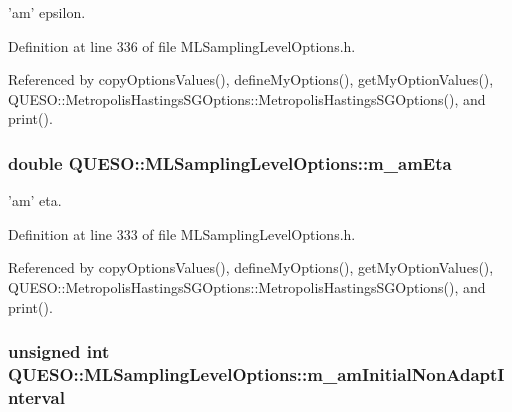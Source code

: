'am' epsilon. 



Definition at line 336 of file M\-L\-Sampling\-Level\-Options.\-h.



Referenced by copy\-Options\-Values(), define\-My\-Options(), get\-My\-Option\-Values(), Q\-U\-E\-S\-O\-::\-Metropolis\-Hastings\-S\-G\-Options\-::\-Metropolis\-Hastings\-S\-G\-Options(), and print().

\hypertarget{class_q_u_e_s_o_1_1_m_l_sampling_level_options_a87fe9b1c390bf7bff2ecc329064e7618}{
\subsubsection[{m\-\_\-am\-Eta}]{\setlength{\rightskip}{0pt plus 5cm}double Q\-U\-E\-S\-O\-::\-M\-L\-Sampling\-Level\-Options\-::m\-\_\-am\-Eta}}\label{class_q_u_e_s_o_1_1_m_l_sampling_level_options_a87fe9b1c390bf7bff2ecc329064e7618}


'am' eta. 



Definition at line 333 of file M\-L\-Sampling\-Level\-Options.\-h.



Referenced by copy\-Options\-Values(), define\-My\-Options(), get\-My\-Option\-Values(), Q\-U\-E\-S\-O\-::\-Metropolis\-Hastings\-S\-G\-Options\-::\-Metropolis\-Hastings\-S\-G\-Options(), and print().

\hypertarget{class_q_u_e_s_o_1_1_m_l_sampling_level_options_a75d028be834232b634bf5a23dcc73ed1}{
\subsubsection[{m\-\_\-am\-Initial\-Non\-Adapt\-Interval}]{\setlength{\rightskip}{0pt plus 5cm}unsigned int Q\-U\-E\-S\-O\-::\-M\-L\-Sampling\-Level\-Options\-::m\-\_\-am\-Initial\-Non\-Adapt\-Interval}}\label{class_q_u_e_s_o_1_1_m_l_sampling_level_options_a75d028be834232b634bf5a23dcc73ed1}


